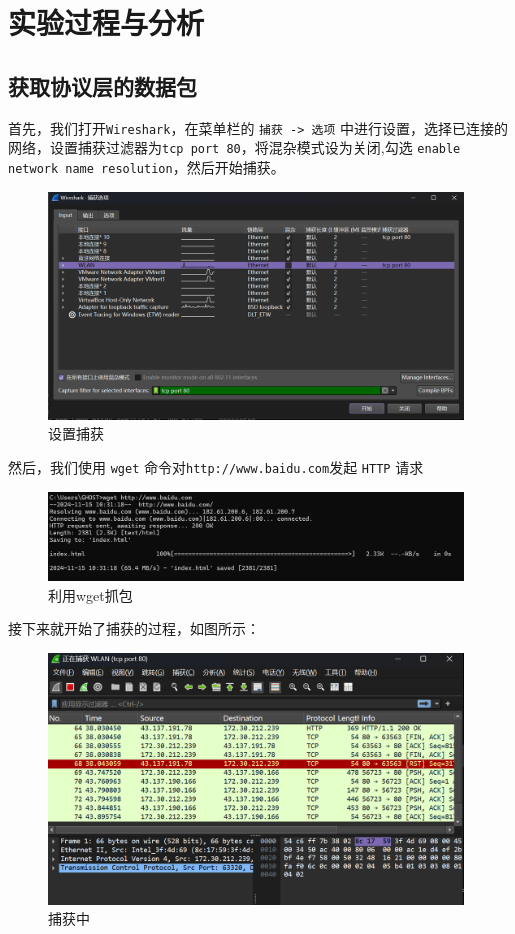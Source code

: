 \documentclass{article}
\begin{document}
	\section{实验过程与分析}
	
	\subsection{获取协议层的数据包}
	
	首先，我们打开\texttt{Wireshark}，在菜单栏的 \texttt{捕获 -> 选项} 中进行设置，选择已连接的网络，设置捕获过滤器为\texttt{tcp port 80}，将混杂模式设为关闭,勾选 \texttt{enable network  name resolution}，然后开始捕获。
	
	\begin{figure}[H]
		\centering
		\includegraphics[width=11cm]{images/2.设置捕获.png}
		\caption{设置捕获}
	\end{figure}
	
	然后，我们使用 \texttt{wget} 命令对\texttt{http://www.baidu.com}发起 \texttt{HTTP} 请求
	
	\begin{figure}[H]
		\centering
		\includegraphics[width=11cm]{images/3.利用wget抓包.png}
		\caption{利用wget抓包}
	\end{figure}
	
	接下来就开始了捕获的过程，如图所示：
	
	\begin{figure}[H]
		\centering
		\includegraphics[width=11cm]{images/4.捕获中.png}
		\caption{捕获中}
	\end{figure}
	
\end{document}
